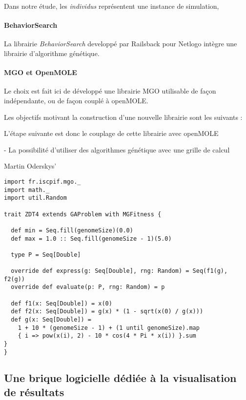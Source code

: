 Dans notre étude, les \textit{individus} représentent une instance de simulation,



\paragraph{BehaviorSearch}

La librairie \textit{BehaviorSearch} developpé par Railsback pour Netlogo intègre une librairie d'algorithme génétique.

\paragraph{MGO et OpenMOLE}

Le choix est fait ici de développé une librairie MGO utilisable de façon indépendante, ou de façon couplé à openMOLE. 

Les objectifs motivant la construction d'une nouvelle librairie sont les suivants : 



L'étape suivante est donc le couplage de cette librairie avec openMOLE 


- La possibilité d'utiliser des algorithmes génétique avec une grille de calcul


Martin Oderskys’


\begin{verbatim}
import fr.iscpif.mgo._
import math._
import util.Random

trait ZDT4 extends GAProblem with MGFitness {

  def min = Seq.fill(genomeSize)(0.0)
  def max = 1.0 :: Seq.fill(genomeSize - 1)(5.0)

  type P = Seq[Double]

  override def express(g: Seq[Double], rng: Random) = Seq(f1(g), f2(g))
  override def evaluate(p: P, rng: Random) = p

  def f1(x: Seq[Double]) = x(0)
  def f2(x: Seq[Double]) = g(x) * (1 - sqrt(x(0) / g(x)))
  def g(x: Seq[Double]) =
    1 + 10 * (genomeSize - 1) + (1 until genomeSize).map 
    { i => pow(x(i), 2) - 10 * cos(4 * Pi * x(i)) }.sum
}
}
\end{verbatim}

\subsection{Une brique logicielle dédiée à la visualisation de résultats}


